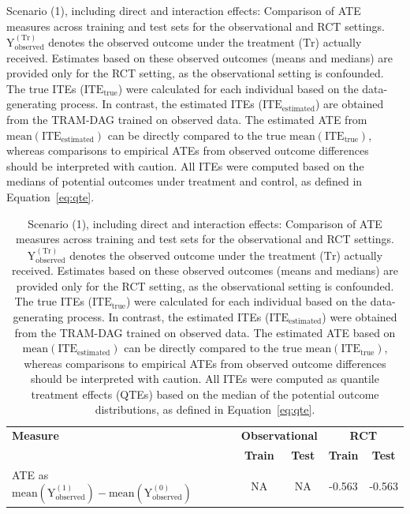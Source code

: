 \begin{table}[htbp]
\centering
\small
\caption{Scenario (1), including direct and interaction effects: Comparison of ATE measures across training and test sets for the observational and RCT settings. $\text{Y}_\text{observed}^{(\text{Tr})}$ denotes the observed outcome under the treatment ($\text{Tr}$) actually received. Estimates based on these observed outcomes (means and medians) are provided only for the RCT setting, as the observational setting is confounded. The true ITEs ($\text{ITE}_\text{true}$) were calculated for each individual based on the data-generating process. In contrast, the estimated ITEs ($\text{ITE}_\text{estimated}$) are obtained from the TRAM-DAG trained on observed data. The estimated ATE from $\text{mean}(\text{ITE}_\text{estimated})$ can be directly compared to the true $\text{mean}(\text{ITE}_\text{true})$, whereas comparisons to empirical ATEs from observed outcome differences should be interpreted with caution. All ITEs were computed based on the medians of potential outcomes under treatment and control, as defined in Equation~\ref{eq:qte}.}

\caption{Scenario (1), including direct and interaction effects: Comparison of ATE measures across training and test sets for the observational and RCT settings. $\text{Y}_\text{observed}^{(\text{Tr})}$ denotes the observed outcome under the treatment ($\text{Tr}$) actually received. Estimates based on these observed outcomes (means and medians) are provided only for the RCT setting, as the observational setting is confounded. The true ITEs ($\text{ITE}_\text{true}$) were calculated for each individual based on the data-generating process. In contrast, the estimated ITEs ($\text{ITE}_\text{estimated}$) were obtained from the TRAM-DAG trained on observed data. The estimated ATE based on $\text{mean}(\text{ITE}_\text{estimated})$ can be directly compared to the true $\text{mean}(\text{ITE}_\text{true})$, whereas comparisons to empirical ATEs from observed outcome differences should be interpreted with caution. All ITEs were computed as quantile treatment effects (QTEs) based on the median of the potential outcome distributions, as defined in Equation~\ref{eq:qte}.
}

\label{tab:scenario1_ate_comparison}
\begin{tabular}{l c c c c}
\toprule
\textbf{Measure} & \multicolumn{2}{c}{\textbf{Observational}} & \multicolumn{2}{c}{\textbf{RCT}} \\
\cmidrule(lr){2-3} \cmidrule(lr){4-5}
 & \textbf{Train} & \textbf{Test} & \textbf{Train} & \textbf{Test} \\
\midrule
ATE as $\text{mean}(\text{Y}_\text{observed}^{(1)}) - \text{mean}(\text{Y}_\text{observed}^{(0)})$ 
& NA & NA 
& -0.563 
& -0.563 \\


\end{tabular}
\end{table}
